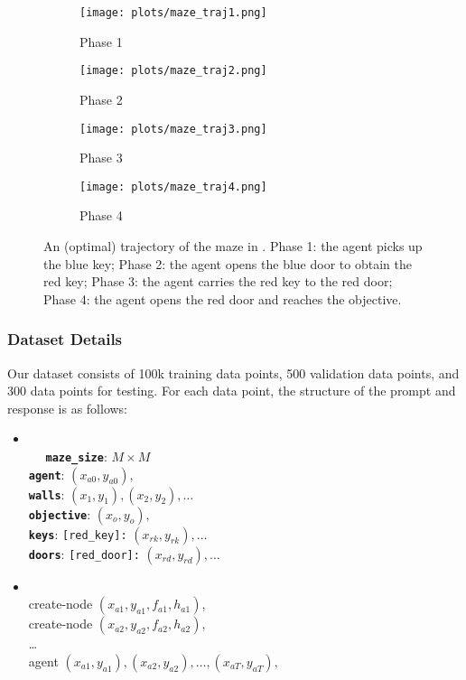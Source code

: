 \begin{figure}[H]
  \centering
  \begin{subfigure}[b]{0.22\textwidth}
    \centering
    \texttt{[image: plots/maze\_traj1.png]}
    \caption{Phase 1}
  \end{subfigure}
  \hfill
  \begin{subfigure}[b]{0.22\textwidth}
    \centering
    \texttt{[image: plots/maze\_traj2.png]}
    \caption{Phase 2}
  \end{subfigure}
  \hfill
  \begin{subfigure}[b]{0.22\textwidth}
    \centering
    \texttt{[image: plots/maze\_traj3.png]}
    \caption{Phase 3}
  \end{subfigure}
  \hfill
  \begin{subfigure}[b]{0.22\textwidth}
    \centering
    \texttt{[image: plots/maze\_traj4.png]}
    \caption{Phase 4}
  \end{subfigure}
  \caption{An (optimal) trajectory of the maze in . Phase 1: the agent picks up the blue key; Phase 2: the agent opens the blue door to obtain the red key; Phase 3: the agent carries the red key to the red door; Phase 4: the agent opens the red door and reaches the objective. }
  \label{fig:maze_traj}
\end{figure}

\subsubsection{Dataset Details}
Our dataset consists of 100k training data points, 500 validation data points, and 300 data points for testing.  For each data point, the structure of the prompt and response is as follows:

\begin{itemize}
    \item \prompt
    \\ $\quad$  \texttt{\textbf{maze\_size}}: $M\times M$ \\
    \texttt{\textbf{agent}}: $(x_{a0},y_{a0}),$   \\ \texttt{\textbf{walls}}: $(x_1,y_1), (x_2,y_2), \ldots $ 
    \\  \texttt{\textbf{objective}}: $(x_o,y_o),$
    \\ \texttt{\textbf{keys}}: \texttt{[red\_key]:} $(x_{rk}, y_{rk}), \ldots $
   \\ \texttt{\textbf{doors}}: \texttt{[red\_door]:} $(x_{rd}, y_{rd}), \ldots $
    \item \response
    \\
    create-node $(x_{a1}, y_{a1}, f_{a1}, h_{a1})$, \\create-node $(x_{a2}, y_{a2}, f_{a2}, h_{a2})$, \\ \ldots \\ agent $(x_{a1}, y_{a1}), (x_{a2}, y_{a2}), \ldots, (x_{aT}, y_{aT}),$
\end{itemize}

